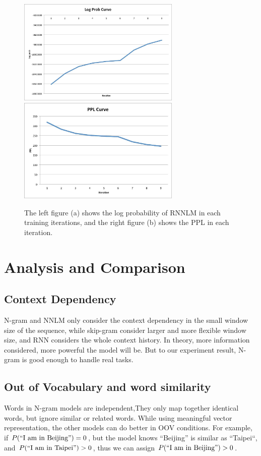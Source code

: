 \documentclass[11pt, oneside]{article}   	%
\begin{document}
\begin{figure}
\includegraphics[width=220pt]{1.jpg}
\includegraphics[width=220pt]{2.jpg}
\caption{The left figure (a) shows the log probability of RNNLM in each training iterations, and the right figure (b) shows the PPL in each iteration.}
\end{figure}
\section{Analysis and Comparison}
\subsection{Context Dependency}
N-gram and NNLM only consider the context dependency in the small window size of the sequence, while skip-gram consider larger and more flexible window size, and RNN considers the whole context history. In theory, more information considered, more powerful the model will be. But to our experiment result, N-gram is good enough to handle real tasks.
\subsection{Out of Vocabulary and word similarity}
Words in N-gram models are independent,They only map together identical words, but ignore similar or related words. While using meaningful vector representation, the other models can do better in OOV conditions. For example, if $P(``\text{I am in Beijing}") =0 $, but the model knows ``Beijing'' is similar as ``Taipei``, and $P(``\text{I am in Taipei}") >0 $, thus we can assign $P(``\text{I am in Beijing}") >0 $.
\end{document}
